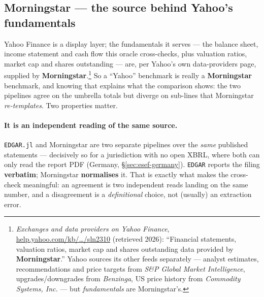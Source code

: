 \documentclass[11pt,a4paper]{report}
\begin{document}
\subsection{Morningstar --- the source behind Yahoo's fundamentals}\label{sec:morningstar}

Yahoo Finance is a display layer; the fundamentals it serves --- the balance sheet, income statement and cash
flow this oracle cross-checks, plus valuation ratios, market cap and shares outstanding --- are, per Yahoo's
own data-providers page, supplied by \textbf{Morningstar}.\footnote{\emph{Exchanges and data providers on Yahoo
Finance}, \href{https://help.yahoo.com/kb/finance-for-web/exchanges-data-providers-yahoo-finance-sln2310.html}%
{help.yahoo.com/kb/\ldots/sln2310} (retrieved 2026): ``Financial statements, valuation ratios, market cap and
shares outstanding data provided by \textbf{Morningstar}.'' Yahoo sources its other feeds separately --- analyst
estimates, recommendations and price targets from \emph{S\&P Global Market Intelligence}, upgrades/downgrades
from \emph{Benzinga}, US price history from \emph{Commodity Systems, Inc.} --- but \emph{fundamentals} are
Morningstar's.} So a ``Yahoo'' benchmark is really a \textbf{Morningstar} benchmark, and knowing that explains
what the comparison shows: the two pipelines agree on the umbrella totals but diverge on sub-lines that
Morningstar \emph{re-templates}. Two properties matter.

\paragraph{It is an independent reading of the same source.} \texttt{EDGAR.jl} and Morningstar are two separate
pipelines over the \emph{same} published statements --- decisively so for a jurisdiction with no open XBRL, where
both can only read the report PDF (Germany, \S\ref{sec:esef-germany}). \texttt{EDGAR} reports the filing
\textbf{verbatim}; Morningstar \textbf{normalises} it. That is exactly what makes the cross-check meaningful: an
agreement is two independent reads landing on the same number, and a disagreement is a \emph{definitional}
choice, not (usually) an extraction error.
\end{document}
